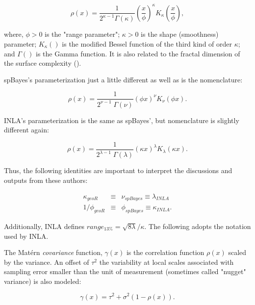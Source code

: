 \documentclass[letterpaper,portrait,11pt]{scrartcl}
\numberwithin{equation}{section}    %
\numberwithin{figure}{section}    %
\numberwithin{table}{section}       %
\begin{document}
\begin{appendices}
\begin{equation}
    \rho(x) = \frac{1}{2^{\kappa-1} \Gamma(\kappa)}
    {\left( \frac{x}{\phi} \right)  }^{\kappa} K_{\kappa}\left( \frac{x}{\phi} \right),
\end{equation}

where, $\phi > 0$ is the "range parameter";  $\kappa > 0$ is the shape (smoothness) parameter; $K_{\kappa}()$ is the modified Bessel function of the third kind of order $\kappa$; and $\Gamma()$ is the Gamma function. It is also related to the fractal dimension of the surface complexity (\cite{Schepers:2002:fractals, constantine:1994}). 

spBayes's \parencite{finley:2007} parameterization just a little different as well as is the nomenclature:

\begin{equation}
\rho(x) = \frac{ 1 }{ 2^{\nu-1} \; \Gamma(\nu) }  \left( \phi x \right) ^{\nu} K_{\nu} \left( \phi x  \right). 
\end{equation}


INLA's \parencite{rinla:2015} parameterization is the same as spBayes', but nomenclature is slightly different again:

\begin{equation}
  \rho(x) = \frac{ 1 }{ 2^{\lambda-1} \; \Gamma(\lambda) }  \left( \kappa x \right) ^{\lambda} K_{\lambda} \left( \kappa x  \right) .
\end{equation}

Thus, the following identities are important to interpret the discussions and outputs from these authors:

\begin{eqnarray*}
  \kappa_{geoR} &\equiv& \nu_{spBayes}  \equiv  \lambda_{INLA} \\
  1/\phi_{geoR} &\equiv& \phi_{spBayes} \equiv \kappa_{INLA}.
\end{eqnarray*}


Additionally, INLA defines $range_{13\%} = \sqrt{8 \lambda} / \kappa$. The following adopts the notation used by INLA.

The Mat\'{e}rn \textit{covariance} function, $\gamma(x)$ is the correlation function $\rho(x)$ scaled by the variance. An offset of $\tau^2$ the variability at local scales associated with sampling error smaller than the unit of measurement (sometimes called "nugget" variance) is also modeled:

\begin{equation*}
\gamma(x) = \tau^2 + \sigma^2 ( 1- \rho(x)) .
\end{equation*}



\end{appendices}
\end{document}
